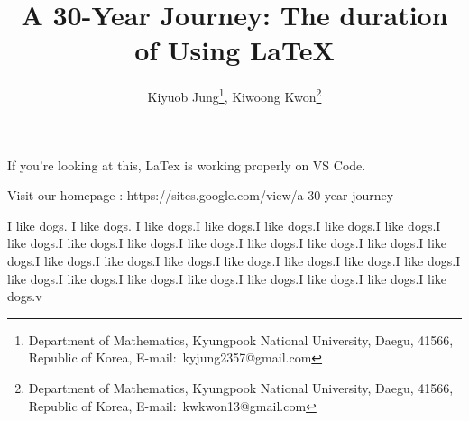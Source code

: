 \documentclass[a4paper,11pt]{article}
\title{
    A 30-Year Journey: The duration of Using LaTeX
    }
\author{
    Kiyuob Jung\thanks{Department of Mathematics, Kyungpook National University, Daegu, 41566, Republic of Korea, E-mail:~kyjung2357@gmail.com},
    Kiwoong Kwon\thanks{Department of Mathematics, Kyungpook National University, Daegu, 41566, Republic of Korea, E-mail:~kwkwon13@gmail.com}
    }
\begin{document}
\date{}
\maketitle

If you're looking at this, LaTex is working properly on VS Code.

Visit our homepage : https://sites.google.com/view/a-30-year-journey

I like dogs. I like dogs. I like dogs.I like dogs.I like dogs.I like dogs.I like dogs.I like dogs.I like dogs.I like dogs.I like dogs.I like dogs.I like dogs.I like dogs.I like dogs.I like dogs.I like dogs.I like dogs.I like dogs.I like dogs.I like dogs.I like dogs.I like dogs.I like dogs.I like dogs.I like dogs.I like dogs.I like dogs.I like dogs.I like dogs.v
\end{document}
